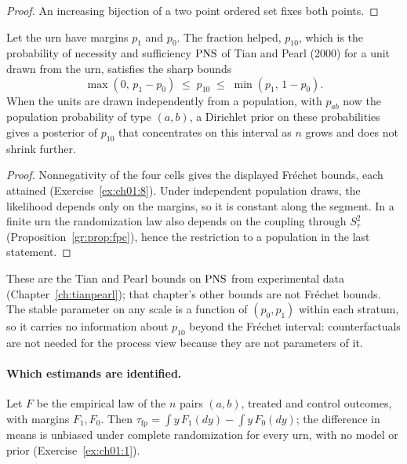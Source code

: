 \begin{proof}
An increasing bijection of a two point ordered set fixes both points.
\end{proof}

\begin{proposition}\label{gr:prop:frechet}
Let the urn have margins $p_1$ and $p_0$. The fraction helped, $p_{10}$, which is the probability of necessity and sufficiency $\mathrm{PNS}$ of Tian and Pearl (2000) for a unit drawn from the urn, satisfies the sharp bounds
\[
\max(0,\,p_1-p_0)\;\le\;p_{10}\;\le\;\min(p_1,\,1-p_0).
\]
When the units are drawn independently from a population, with $p_{ab}$ now the population probability of type $(a,b)$, a Dirichlet prior on these probabilities gives a posterior of $p_{10}$ that concentrates on this interval as $n$ grows and does not shrink further.
\end{proposition}

\begin{proof}
Nonnegativity of the four cells gives the displayed Fr\'echet bounds, each attained (Exercise~\ref{ex:ch01:8}). Under independent population draws, the likelihood depends only on the margins, so it is constant along the segment. In a finite urn the randomization law also depends on the coupling through $S_\tau^2$ (Proposition~\ref{gr:prop:fpc}), hence the restriction to a population in the last statement.
\end{proof}

These are the Tian and Pearl bounds on $\mathrm{PNS}$ from experimental data (Chapter~\ref{ch:tianpearl}); that chapter's other bounds are not Fr\'echet bounds. The stable parameter on any scale is a function of $(p_0,p_1)$ within each stratum, so it carries no information about $p_{10}$ beyond the Fr\'echet interval: counterfactuals are not needed for the process view because they are not parameters of it.

\paragraph{Which estimands are identified.} Let $F$ be the empirical law of the $n$ pairs $(a,b)$, treated and control outcomes, with margins $F_1,F_0$. Then $\tau_{\mathrm{fp}}=\int y\,F_1(dy)-\int y\,F_0(dy)$; the difference in means is unbiased under complete randomization for every urn, with no model or prior (Exercise~\ref{ex:ch01:1}).

